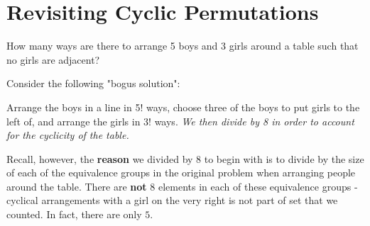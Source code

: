
% 






% 




\section{Revisiting Cyclic Permutations}
\begin{problem}{1}
How many ways are there to arrange 5 boys and 3 girls around a table such that no girls are adjacent?
\end{problem}
Consider the following "bogus solution":
\begin{solution}
	Arrange the boys in a line in 5! ways, choose three of the boys to put girls to the left of, and arrange the girls in 3! ways. \textit{We then divide by 8 in order to account for the cyclicity of the table.}
\end{solution}
\newline
Recall, however, the \textbf{reason} we divided by $8$ to begin with is to divide by the size of each of the equivalence groups in the original problem when arranging people around the table. There are \textbf{not} $8$ elements in each of these equivalence groups - cyclical arrangements with a girl on the very right is not part of set that we counted. In fact, there are only $5$. 


